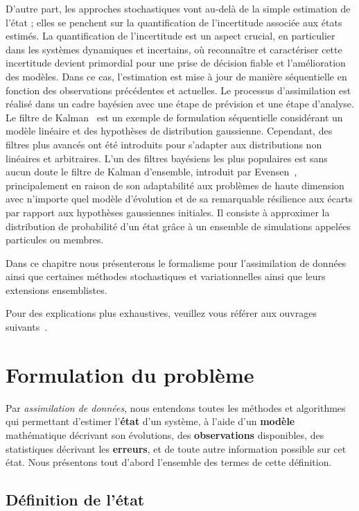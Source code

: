 D'autre part, les approches stochastiques vont au-delà de la simple estimation de l'état ; elles se penchent sur la quantification de l'incertitude associée aux états estimés. La quantification de l'incertitude est un aspect crucial, en particulier dans les systèmes dynamiques et incertains, où reconnaître et caractériser cette incertitude devient primordial pour une prise de décision fiable et l'amélioration des modèles. Dans ce cas, l'estimation est mise à jour de manière séquentielle en fonction des observations précédentes et actuelles. Le processus d'assimilation est réalisé dans un cadre bayésien avec une étape de prévision et une étape d'analyse. Le filtre de Kalman~\cite{kalman_new_1960} est un exemple de formulation séquentielle considérant un modèle linéaire et des hypothèses de distribution gaussienne. Cependant, des filtres plus avancés ont été introduits pour s'adapter aux distributions non linéaires et arbitraires. L'un des filtres bayésiens les plus populaires est sans aucun doute le filtre de Kalman d'ensemble, introduit par Evensen~\cite{evensen_sequential_1994}, principalement en raison de son adaptabilité aux problèmes de haute dimension avec n'importe quel modèle d'évolution et de sa remarquable résilience aux écarts par rapport aux hypothèses gaussiennes initiales. Il consiste à approximer la distribution de probabilité d'un état grâce à un ensemble de simulations appelées particules ou membres.

Dans ce chapitre nous présenterons le formalisme pour l'assimilation de données ainsi que certaines méthodes stochastiques et variationnelles ainsi que leurs extensions ensemblistes.

Pour des explications plus exhaustives, veuillez vous référer aux ouvrages suivants~\cite{law_data_2015,asch_data_2016,evensen_data_2022}.

\section{Formulation du problème}

Par \textit{assimilation de données}, nous entendons toutes les méthodes et algorithmes qui permettant d’estimer l’\textbf{état} d’un système, à l’aide d’un \textbf{modèle} mathématique décrivant son évolutions, des \textbf{observations} disponibles, des statistiques décrivant les \textbf{erreurs}, et de toute autre information possible sur cet état. Nous présentons tout d'abord l'ensemble des termes de cette définition.

\subsection{Définition de l'état}

